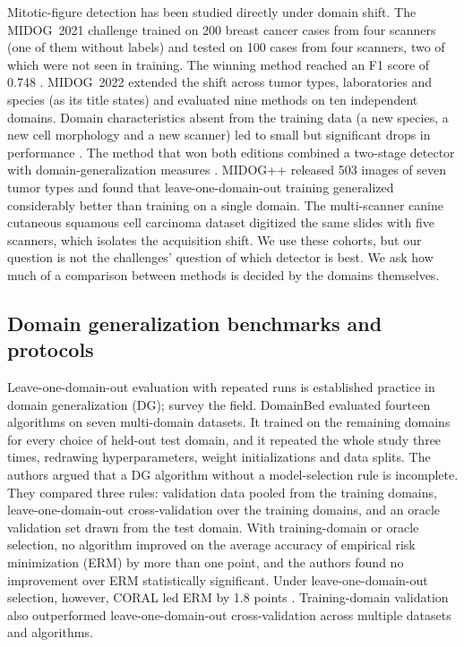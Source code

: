 Mitotic-figure detection has been studied directly under domain shift. The
MIDOG~2021 challenge trained on 200 breast cancer cases from four scanners (one
of them without labels) and
tested on 100 cases from four scanners, two of which were not seen in training.
The winning method reached an F1 score of 0.748 \citep{aubreville2023midog}.
MIDOG~2022 extended the shift across tumor types, laboratories and species
(as its title states) and evaluated nine methods on ten independent domains. Domain characteristics
absent from the training data (a new species, a new cell morphology and a new
scanner) led to small but significant drops in performance
\citep{aubreville2024midog2022}. The method that won both editions combined a
two-stage detector with domain-generalization measures
\citep{jahanifar2024mitosis}. MIDOG++ \citep{aubreville2023midogpp} released
503 images of seven tumor types and found that leave-one-domain-out training
generalized considerably better than training on a single domain. The
multi-scanner canine cutaneous squamous cell carcinoma dataset
\citep{wilm2023canine} digitized the same slides with five scanners, which
isolates the acquisition shift. We use these cohorts, but our question is not
the challenges' question of which detector is best. We ask how much of a
comparison between methods is decided by the domains themselves.

\subsection{Domain generalization benchmarks and protocols}
\label{sec:related-dg}

Leave-one-domain-out evaluation with repeated runs is established practice in
domain generalization (DG); \citet{zhou2023domain} survey the field. DomainBed
\citep{gulrajani2021domainbed} evaluated fourteen algorithms on seven
multi-domain datasets. It trained on the remaining domains for every choice of held-out test
domain, and it repeated the whole study three times, redrawing hyperparameters,
weight initializations and data splits. The authors argued that a DG algorithm
without a model-selection rule is incomplete. They compared three rules:
validation data pooled from the training domains, leave-one-domain-out
cross-validation over the training domains, and an oracle validation set drawn
from the test domain. With training-domain or oracle selection, no algorithm
improved on the average accuracy of empirical risk minimization (ERM) by more
than one point, and the authors found no improvement over ERM statistically
significant. Under leave-one-domain-out selection, however, CORAL led ERM by
1.8 points \citep[Table~3]{gulrajani2021domainbed}.
Training-domain validation also outperformed leave-one-domain-out
cross-validation across multiple datasets and algorithms.

